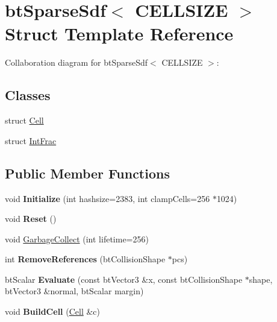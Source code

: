 \hypertarget{structbt_sparse_sdf}{\section{bt\+Sparse\+Sdf$<$ C\+E\+L\+L\+S\+I\+Z\+E $>$ Struct Template Reference}
\label{structbt_sparse_sdf}
}


Collaboration diagram for bt\+Sparse\+Sdf$<$ C\+E\+L\+L\+S\+I\+Z\+E $>$\+:
\subsection*{Classes}
\begin{DoxyCompactItemize}
\item 
struct \hyperlink{structbt_sparse_sdf_1_1_cell}{Cell}
\item 
struct \hyperlink{structbt_sparse_sdf_1_1_int_frac}{Int\+Frac}
\end{DoxyCompactItemize}
\subsection*{Public Member Functions}
\begin{DoxyCompactItemize}
\item 
\hypertarget{structbt_sparse_sdf_afe91a2239636a83c17b9ae57034a9d2f}{void {\bfseries Initialize} (int hashsize=2383, int clamp\+Cells=256 $\ast$1024)}\label{structbt_sparse_sdf_afe91a2239636a83c17b9ae57034a9d2f}

\item 
\hypertarget{structbt_sparse_sdf_a2f650f4de0d04f74ee7cf17cf598ea24}{void {\bfseries Reset} ()}\label{structbt_sparse_sdf_a2f650f4de0d04f74ee7cf17cf598ea24}

\item 
void \hyperlink{structbt_sparse_sdf_a08dbaa356f577ebbd0808329766111d1}{Garbage\+Collect} (int lifetime=256)
\item 
\hypertarget{structbt_sparse_sdf_a83c76728ac778112b4c1c2fb82ba4477}{int {\bfseries Remove\+References} (bt\+Collision\+Shape $\ast$pcs)}\label{structbt_sparse_sdf_a83c76728ac778112b4c1c2fb82ba4477}

\item 
\hypertarget{structbt_sparse_sdf_a9e16c04bb8321538b9b79d426a251096}{bt\+Scalar {\bfseries Evaluate} (const bt\+Vector3 \&x, const bt\+Collision\+Shape $\ast$shape, bt\+Vector3 \&normal, bt\+Scalar margin)}\label{structbt_sparse_sdf_a9e16c04bb8321538b9b79d426a251096}

\item 
\hypertarget{structbt_sparse_sdf_ac91f0a240d638c6c69c900d6995e6eb8}{void {\bfseries Build\+Cell} (\hyperlink{structbt_sparse_sdf_1_1_cell}{Cell} \&c)}\label{structbt_sparse_sdf_ac91f0a240d638c6c69c900d6995e6eb8}

\end{DoxyCompactItemize}

